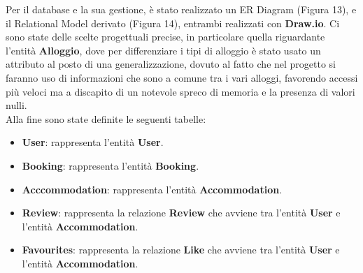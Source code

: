 \documentclass[10pt]{article}
\begin{document}
Per il database e la sua gestione, \`e stato realizzato un ER Diagram (Figura 13), e il Relational Model derivato (Figura 14), entrambi realizzati con \textbf{Draw.io}. Ci sono state delle scelte progettuali precise, in particolare quella riguardante l'entit\`a \textbf{Alloggio}, dove per differenziare i tipi di alloggio \`e stato usato un attributo al posto di una generalizzazione, dovuto al fatto che nel progetto si faranno uso di informazioni che sono a comune tra i vari alloggi, favorendo accessi pi\`u veloci ma a discapito di un notevole spreco di memoria e la presenza di valori nulli.\\
Alla fine sono state definite le seguenti tabelle:
\begin{itemize}
\item \textbf{User}: rappresenta l'entit\`a \textbf{User}.
\item \textbf{Booking}: rappresenta l'entit\`a \textbf{Booking}.
\item \textbf{Acccommodation}: rappresenta l'entit\`a \textbf{Accommodation}.
\item \textbf{Review}: rappresenta la relazione \textbf{Review} che avviene tra l'entit\`a \textbf{User} e l'entit\`a \textbf{Accommodation}.
\item \textbf{Favourites}: rappresenta la relazione \textbf{Like} che avviene tra l'entit\`a \textbf{User} e l'entit\`a \textbf{Accommodation}.
\end{itemize}
\end{document}
